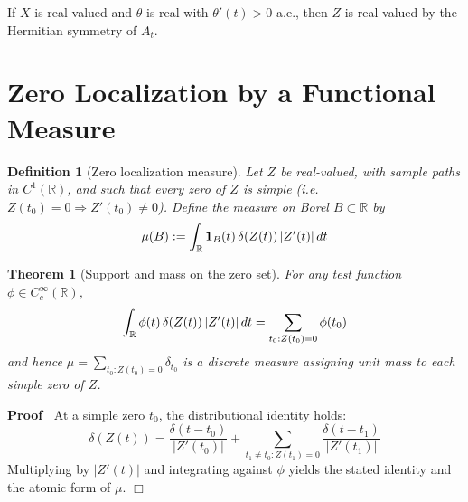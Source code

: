 \documentclass{article}
\newcommand{\assign}{:=}
\newenvironment{proof}{\noindent\textbf{Proof\ }}{\hspace*{\fill}$\Box$\medskip}
\newtheorem{definition}{Definition}
\newtheorem{theorem}{Theorem}
\begin{document}
\begin{remark}
   If $X$ is real-valued and $\theta$ is
  real with $\theta' (t) > 0$ a.e., then $Z$ is real-valued by the Hermitian
  symmetry of $A_t$.
\end{remark}

\section{Zero Localization by a Functional Measure}

\begin{definition}
  [Zero localization measure] Let $Z$ be real-valued, with sample paths in
  $C^1 (\mathbb{R})$, and such that every zero of $Z$ is simple (i.e. $Z (t_0)
  = 0 \Longrightarrow Z' (t_0) \neq 0$). Define the measure on Borel $B
  \subset \mathbb{R}$ by
  \begin{equation}
    \mu (B) \assign \int_{\mathbb{R}} \textbf{1}_B (t)  \hspace{0.17em} \delta
    (Z (t)) \hspace{0.17em} |Z' (t) |  \hspace{0.17em} dt
  \end{equation}
\end{definition}

\begin{theorem}
  [Support and mass on the zero set] For any test function $\phi \in
  C_c^{\infty} (\mathbb{R})$,
  \begin{equation}
    \int_{\mathbb{R}} \phi (t)  \hspace{0.17em} \delta (Z (t)) \hspace{0.17em}
    |Z' (t) |  \hspace{0.17em} dt = \sum_{t_0 : Z (t_0) = 0} \phi (t_0)
  \end{equation}
  and hence $\mu = \sum_{t_0 : Z (t_0) = 0} \delta_{t_0}$ is a discrete
  measure assigning unit mass to each simple zero of $Z$.
\end{theorem}

\begin{proof}
  At a simple zero $t_0$, the distributional identity holds:
  \begin{equation}
    \delta (Z (t)) = \frac{\delta (t - t_0)}{|Z' (t_0) |} + \sum_{t_1 \neq t_0
    : Z (t_1) = 0} \frac{\delta (t - t_1)}{|Z' (t_1) |}
  \end{equation}
  Multiplying by $|Z' (t) |$ and integrating against $\phi$ yields the stated
  identity and the atomic form of $\mu$.
\end{proof}
\end{document}
